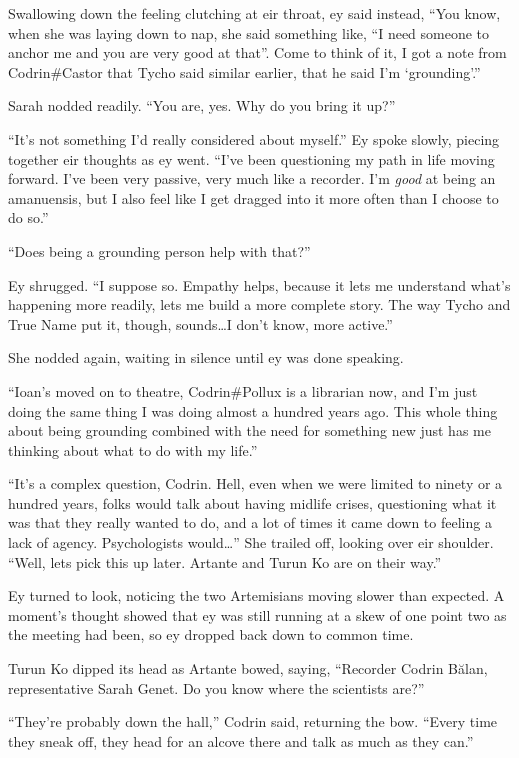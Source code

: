 Swallowing down the feeling clutching at eir throat, ey said instead, ``You know, when she was laying down to nap, she said something like, ``I need someone to anchor me and you are very good at that''. Come to think of it, I got a note from Codrin\#Castor that Tycho said similar earlier, that he said I'm `grounding'.''

Sarah nodded readily. ``You are, yes. Why do you bring it up?''

``It's not something I'd really considered about myself.'' Ey spoke slowly, piecing together eir thoughts as ey went. ``I've been questioning my path in life moving forward. I've been very passive, very much like a recorder. I'm \emph{good} at being an amanuensis, but I also feel like I get dragged into it more often than I choose to do so.''

``Does being a grounding person help with that?''

Ey shrugged. ``I suppose so. Empathy helps, because it lets me understand what's happening more readily, lets me build a more complete story. The way Tycho and True Name put it, though, sounds\ldots I don't know, more active.''

She nodded again, waiting in silence until ey was done speaking.

``Ioan's moved on to theatre, Codrin\#Pollux is a librarian now, and I'm just doing the same thing I was doing almost a hundred years ago. This whole thing about being grounding combined with the need for something new just has me thinking about what to do with my life.''

``It's a complex question, Codrin. Hell, even when we were limited to ninety or a hundred years, folks would talk about having midlife crises, questioning what it was that they really wanted to do, and a lot of times it came down to feeling a lack of agency. Psychologists would\ldots{}'' She trailed off, looking over eir shoulder. ``Well, lets pick this up later. Artante and Turun Ko are on their way.''

Ey turned to look, noticing the two Artemisians moving slower than expected. A moment's thought showed that ey was still running at a skew of one point two as the meeting had been, so ey dropped back down to common time.

Turun Ko dipped its head as Artante bowed, saying, ``Recorder Codrin Bălan, representative Sarah Genet. Do you know where the scientists are?''

``They're probably down the hall,'' Codrin said, returning the bow. ``Every time they sneak off, they head for an alcove there and talk as much as they can.''

